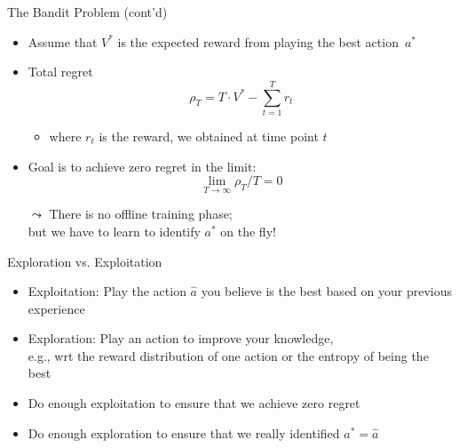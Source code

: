 \documentclass[aspectratio=169]{../latex_main/tntbeamer}  %
\begin{document}
\begin{frame}[c]{The Bandit Problem (cont'd)}
	
	\begin{itemize}
		\item Assume that $V^*$ is the expected reward from playing the best action~$a^*$
		\item Total regret
		$$\rho_T = T \cdot V^* - \sum^T_{t=1} r_t $$
		\begin{itemize}
			\item where $r_t$ is the reward, we obtained at time point $t$
		\end{itemize}
	\medskip
		\item Goal is to achieve zero regret in the limit:
		$$\lim_{T \to \infty} \rho_T / T = 0$$	
		\item[$\leadsto$] There is no offline training phase;\\ but we have to learn to identify $a^*$ on the fly!
	\end{itemize}
	
\end{frame}
\begin{frame}[c]{Exploration vs. Exploitation}
	
	\begin{itemize}
		\item \alert{Exploitation}: Play the action $\hat{a}$ you believe is the best based on your previous experience
		\medskip
		\item \alert{Exploration}: Play an action to improve your knowledge,\\ e.g., wrt the reward distribution of one action or the entropy of being the best
		\medskip
		\pause
		\item Do enough exploitation to ensure that we achieve zero regret
		\item Do enough exploration to ensure that we really identified $a^* = \hat{a}$
	\end{itemize}
	
\end{frame}
\end{document}
